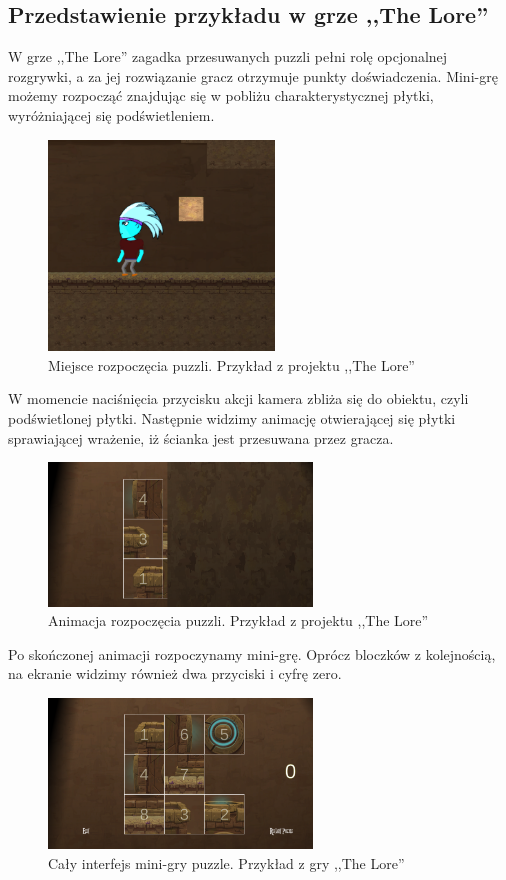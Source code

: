 \documentclass[oneside,polski,logo]{amuthesis}
\begin{document}
\subsection{Przedstawienie przykładu w grze ,,The Lore''}
\par W grze ,,The Lore'' zagadka przesuwanych puzzli pełni rolę opcjonalnej rozgrywki, a za jej rozwiązanie gracz otrzymuje punkty doświadczenia. Mini-grę możemy rozpocząć znajdując się w pobliżu charakterystycznej płytki, wyróżniającej się podświetleniem.
\begin{figure}[h]
	\centering
	\includegraphics[width=6cm]{images/tyrek/the_lore_puzzle_lvl1.png}
	\caption{Miejsce rozpoczęcia puzzli. Przykład z projektu ,,The Lore''}
\end{figure}

W momencie naciśnięcia przycisku akcji kamera zbliża się do obiektu, czyli podświetlonej płytki. Następnie widzimy animację otwierającej się płytki sprawiającej wrażenie, iż ścianka jest przesuwana przez gracza.
\begin{figure}[h]
	\centering
	\includegraphics[width=7cm]{images/tyrek/otwieraniePuzzli.png}
	\caption{Animacja rozpoczęcia puzzli. Przykład z projektu ,,The Lore''}
\end{figure}

Po skończonej animacji rozpoczynamy mini-grę. Oprócz bloczków z kolejnością, na ekranie widzimy również dwa przyciski i cyfrę zero.
\begin{figure}[h]
	\centering
	\includegraphics[width=7cm]{images/tyrek/puzzlebuttons.png}
	\caption{Cały interfejs mini-gry puzzle. Przykład z gry ,,The Lore''}
\end{figure}
\end{document}
